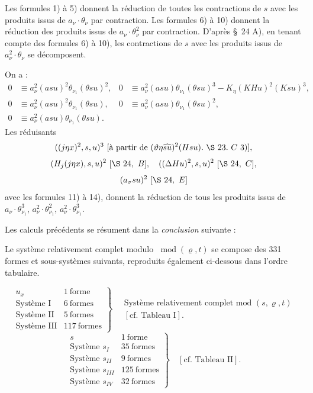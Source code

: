 \documentclass[11pt]{article}
\newcommand{\D}{\Delta}
\newcommand{\R}{\varrho}
\newcommand{\modu}[1]{\;\operatorname{mod} #1}
\providecommand{\modu}[1]{\;\operatorname{mod} #1}
\begin{document}
Les formules 1) à 5) donnent la réduction de toutes les contractions de $s$ avec les produits issus de $a_\nu\cdot\theta_\nu$ par contraction. Les formules 6) à 10) donnent la réduction des produits issus de $a_\nu\cdot\theta_\nu^2$ par contraction. D'après \S\ 24 A), en tenant compte des formules 6) à 10), les contractions de $s$ avec les produits issus de $a_\nu^2\cdot\theta_\nu$ se décomposent.

On a :
\begin{align*}
0&\equiv a_\nu^2(asu)^2\theta_{\nu_1}(\theta su)^2,
&0&\equiv a_\nu^2(asu)\theta_{\nu_1}(\theta su)^3-K_\eta(KHu)^2(Ksu)^3,\\
0&\equiv a_\nu^2(asu)^2\theta_{\nu_1}(\theta su),
&0&\equiv a_\nu^2(asu)\theta_{\nu_1}(\theta su)^2,\\
0&\equiv a_\nu^2(asu)\theta_{\nu_1}(\theta su).
\end{align*}
Les réduisants
\[
 ((j\eta x)^2,s,u)^3
 \ [\hbox{à partir de }(\vartheta\eta\widehat{su})^2(Hsu).\ \S\ 23.\ C\ 3)],
\]
\[
(H_j(j\eta x),s,u)^2\ [\S\ 24,\ B],
\quad ((\D Hu)^2,s,u)^2\ [\S\ 24,\ C],
\]
\[
(a_\sigma su)^2\ [\S\ 24,\ E]
\]
avec les formules 11) à 14), donnent la réduction de tous les produits issus de $a_\nu\cdot\theta_{\nu_1}^3$, $a_\nu^2\cdot\theta_{\nu_1}^2$, $a_\nu^2\cdot\theta_{\nu_1}^3$.

Les calculs précédents se résument dans la \emph{conclusion} suivante :

Le système relativement complet modulo $\modu{(\R,t)}$ se compose des 331 formes et sous-systèmes suivants, reproduits également ci-dessous dans l'ordre tabulaire.

\[
\left.
\begin{array}{lr}
u_x&1\ \text{forme}\\
\text{Système I}&6\ \text{formes}\\
\text{Système II}&5\ \text{formes}\\
\text{Système III}&117\ \text{formes}
\end{array}
\right\}
\quad
\begin{gathered}
\text{Système relativement complet mod }(s,\varrho,t)\\
[\text{cf. Tableau I}].
\end{gathered}
\]
\[
\left.
\begin{array}{lr}
s&1\ \text{forme}\\
\text{Système }s_I&35\ \text{formes}\\
\text{Système }s_{II}&9\ \text{formes}\\
\text{Système }s_{III}&125\ \text{formes}\\
\text{Système }s_{IV}&32\ \text{formes}
\end{array}
\right\}
\quad [\text{cf. Tableau II}].
\]
\end{document}
